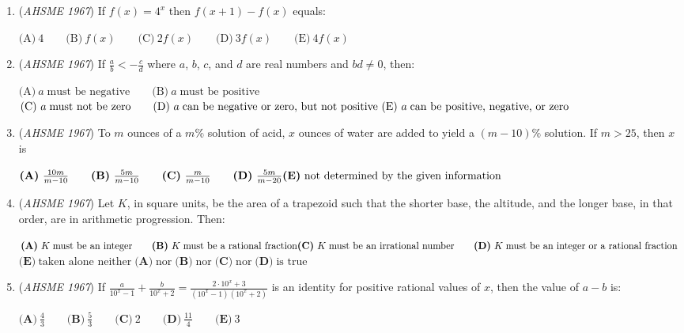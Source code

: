 \begin{enumerate}
	\item (\textit{AHSME 1967}) If $f(x)=4^x$ then $f(x+1)-f(x)$ equals:


 $\text{(A)}\ 4\qquad\text{(B)}\ f(x)\qquad\text{(C)}\ 2f(x)\qquad\text{(D)}\ 3f(x)\qquad\text{(E)}\ 4f(x)$


	\item (\textit{AHSME 1967}) If $\frac{a}{b}<-\frac{c}{d}$ where $a$, $b$, $c$, and $d$ are real numbers and $bd \not= 0$, then:


 $\text{(A)}\ a \; \text{must be negative} \qquad \text{(B)}\ a \; \text{must be positive} \qquad$
$\text{(C)}\ a \; \text{must not be zero} \qquad \text{(D)}\ a \; \text{can be negative or zero, but not positive } \\ \text{(E)}\ a \; \text{can be positive, negative, or zero}$


	\item (\textit{AHSME 1967}) To $m$ ounces of a $m\%$ solution of acid, $x$ ounces of water are added to yield a $(m-10)\%$ solution.  If $m>25$, then $x$ is 


 $\textbf{(A)}\ \frac{10m}{m-10} \qquad \textbf{(B)}\ \frac{5m}{m-10} \qquad \textbf{(C)}\ \frac{m}{m-10} \qquad \textbf{(D)}\ \frac{5m}{m-20} \\ \textbf{(E)}\ \text{not determined by the given information}$


	\item (\textit{AHSME 1967}) Let $K$, in square units, be the area of a trapezoid such that the shorter base, the altitude, and the longer base, in that order, are in arithmetic progression.  Then:


 $\textbf{(A)}\ K \; \text{must be an integer} \qquad \textbf{(B)}\ K \; \text{must be a rational fraction} \\ \textbf{(C)}\ K \; \text{must be an irrational number} \qquad \textbf{(D)}\ K\;  \text{must be an integer or a rational fraction} \qquad$
$\textbf{(E)}\ \text{taken alone neither} \; \textbf{(A)} \; \text{nor} \; \textbf{(B)} \; \text{nor} \; \textbf{(C)} \; \text{nor} \; \textbf{(D)} \; \text{is true}$


	\item (\textit{AHSME 1967}) If $\frac{a}{10^x-1}+\frac{b}{10^x+2}=\frac{2 \cdot 10^x+3}{(10^x-1)(10^x+2)}$ is an identity for positive rational values of $x$, then the value of $a-b$ is:


 $\textbf{(A)}\ \frac{4}{3} \qquad \textbf{(B)}\ \frac{5}{3} \qquad \textbf{(C)}\ 2 \qquad \textbf{(D)}\ \frac{11}{4} \qquad \textbf{(E)}\ 3$



\end{enumerate}
